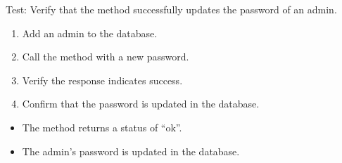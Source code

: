 \documentclass[letterpaper,10pt,english]{sphinxmanual}
\begin{document}
\begin{fulllineitems}
\label{\detokenize{test:test.test_admin.test_update_admin_password_success}}
\pysigstartsignatures
\pysiglinewithargsret
{}
{}
{}
\pysigstopsignatures
\sphinxAtStartPar
Test: Verify that the method successfully updates the password of an admin.
\begin{description}
\begin{enumerate}
%
\item {} 
\sphinxAtStartPar
Add an admin to the database.

\item {} 
\sphinxAtStartPar
Call the  method with a new password.

\item {} 
\sphinxAtStartPar
Verify the response indicates success.

\item {} 
\sphinxAtStartPar
Confirm that the password is updated in the database.

\end{enumerate}

\begin{itemize}
\item {} 
\sphinxAtStartPar
The method returns a status of “ok”.

\item {} 
\sphinxAtStartPar
The admin’s password is updated in the database.

\end{itemize}

\end{description}

\end{fulllineitems}

\end{document}
